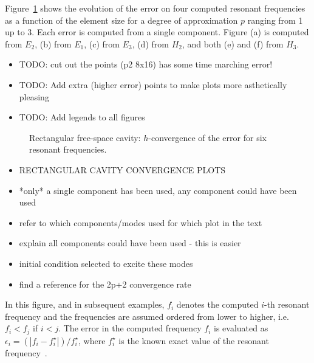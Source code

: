 Figure~\ref{fig:rectangle2DfreeSpace_Convergence} shows the evolution of the
error on four computed resonant frequencies as a function of the element size
for a degree of approximation $p$ ranging from 1 up to 3. Each error is computed
from a single component. Figure (a) is computed from $E_2$, (b) from $E_1$, (c)
from $E_3$, (d) from $H_2$, and both (e) and (f) from $H_3$.
\begin{itemize}
\item TODO: cut out the points (p2 8x16) has some time marching error!
\item TODO: Add extra (higher error) points to make plots more asthetically
  pleasing
\item TODO: Add legends to all figures
\end{itemize}
\begin{figure}[!ht]
	\centering

	\caption{Rectangular free-space cavity: $h$-convergence of the error for six resonant frequencies.}
	\label{fig:rectangle2DfreeSpace_Convergence}
\end{figure}
\begin{itemize}
\item RECTANGULAR CAVITY CONVERGENCE PLOTS
\item *only* a single component has been used, any component could have been used
\item refer to which components/modes used for which plot in the text
\item explain all components could have been used - this is easier
\item initial condition selected to excite these modes
\item find a reference for the 2p+2 convergence rate
\end{itemize}
In this figure, and in subsequent examples, $f_i$ denotes the computed $i$-th resonant frequency and the frequencies are assumed ordered from lower to higher, i.e. $f_i < f_j$ if $i<j$. The error in the computed frequency $f_i$ is evaluated as $\epsilon_i = (|f_i - f_i^\star|)/f_i^\star$, where $f_i^\star$ is the known exact value of the resonant frequency~\cite{BalanisBook}.

